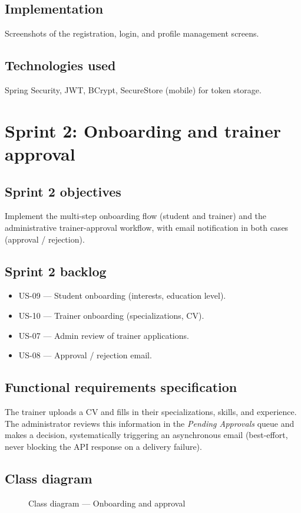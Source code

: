 \documentclass[a4paper,12pt]{report}
\begin{document}
\subsection{Implementation}
Screenshots of the registration, login, and profile management screens.

\subsection{Technologies used}
Spring Security, JWT, BCrypt, SecureStore (mobile) for token storage.

\section{Sprint 2: Onboarding and trainer approval}

\subsection{Sprint 2 objectives}
Implement the multi-step onboarding flow (student and trainer) and the
administrative trainer-approval workflow, with email notification in both
cases (approval / rejection).

\subsection{Sprint 2 backlog}
\begin{itemize}[leftmargin=*]
  \item US-09 --- Student onboarding (interests, education level).
  \item US-10 --- Trainer onboarding (specializations, CV).
  \item US-07 --- Admin review of trainer applications.
  \item US-08 --- Approval / rejection email.
\end{itemize}

\subsection{Functional requirements specification}
The trainer uploads a CV and fills in their specializations, skills, and
experience. The administrator reviews this information in the
\emph{Pending Approvals} queue and makes a decision, systematically
triggering an asynchronous email (best-effort, never blocking the API
response on a delivery failure).

\subsection{Class diagram}
\begin{figure}[H]
\centering
\caption{Class diagram --- Onboarding and approval}
\end{figure}
\end{document}
